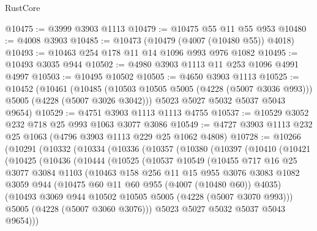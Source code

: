 \begin{lexlean}{RustCore}
\begin{coremodule}
@10475 := @3999 @3903 @1113
@10479 := @10475 @55 @11 @55 @953
@10480 := @4008 @3903
@10485 := @10473 (@10479 (@4007 (@10480 @55)) @4018)
@10493 := @10463 @254 @178 @11 @14 @1096 @993 @976 @1082
@10495 := @10493 @3035 @944
@10502 := @4980 @3903 @1113 @11 @253 @1096 @4991 @4997
@10503 := @10495 @10502
@10505 := @4650 @3903 @1113
@10525 := @10452
    (@10461
      (@10485 (@10503 @10505 @5005 (@4228 (@5007 @3036 @993))) @5005 (@4228 (@5007 @3026 @3042)))
      @5023
      @5027
      @5032
      @5037
      @5043
      @9654)
@10529 := @4751 @3903 @1113 @1113 @4755
@10537 := @10529 @3052 @232 @718 @25 @993 @1063 @3077 @3086
@10549 := @4727 @3903 @1113 @232 @25 @1063 (@4796 @3903 @1113 @229 @25 @1062 @4808)
@10728 := @10266
    (@10291
      (@10332
        (@10334
          (@10336
            (@10357
              (@10380
                (@10397
                  (@10410
                    (@10421
                      (@10425
                        (@10436
                          (@10444
                            (@10525
                              (@10537
                                @10549
                                (@10455
                                  @717
                                  @16
                                  @25
                                  @3077
                                  @3084
                                  @1103
                                  (@10463
                                    @158
                                    @256
                                    @11
                                    @15
                                    @955
                                    @3076
                                    @3083
                                    @1082
                                    @3059
                                    @944
                                    (@10475 @60 @11 @60 @955 (@4007 (@10480 @60)) @4035)
                                    (@10493
                                      @3069
                                      @944
                                      @10502
                                      @10505
                                      @5005
                                      (@4228 (@5007 @3070 @993)))
                                    @5005
                                    (@4228 (@5007 @3060 @3076)))
                                  @5023
                                  @5027
                                  @5032
                                  @5037
                                  @5043
                                  @9654)))

\end{coremodule}
\end{lexlean}

